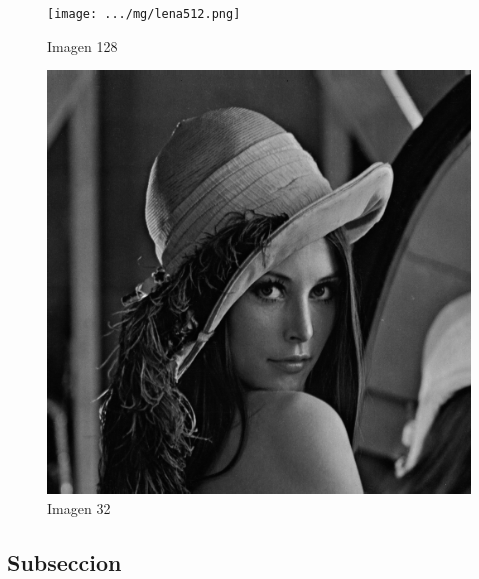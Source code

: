 \documentclass{article}
\begin{document}
\begin{multicols}{2}
\begin{figure}[H]
\centering
\texttt{[image: .../mg/lena512.png]}
\caption{Imagen 128}
\label{Imagen 128}
\end{figure}

\begin{figure}[H]
\centering
\includegraphics[scale=0.2]{../img/lena512.png}
\caption{Imagen 32}
\label{Imagen 32}
\end{figure}

\par 

\subsection{Subseccion}
\label{sec3}


\end{multicols}
\end{document}
